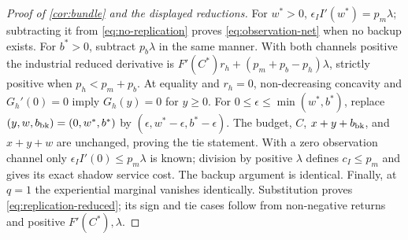 \begin{proof}[Proof of \cref{cor:bundle} and the displayed reductions]
For $w^*>0$, $\epsilon_II'(w^*)=p_m\lambda$; subtracting it from
\cref{eq:no-replication} proves \cref{eq:observation-net} when no
backup exists. For $b^*>0$, subtract $p_b\lambda$ in the same manner.
With both channels positive the industrial reduced derivative is
$F'(C^*)r_h+(p_m+p_b-p_h)\lambda$, strictly positive when
$p_h<p_m+p_b$. At equality and $r_h=0$, non-decreasing concavity and
$G_h'(0)=0$ imply $G_h(y)=0$ for $y\geq0$. For
$0\leq\epsilon\leq\min(w^*,b^*)$, replace
$(y,w,b_{\rm bk})=(0,w^*,b^*)$ by
$(\epsilon,w^*-\epsilon,b^*-\epsilon)$. The budget, $C$, $x+y+b_{\rm bk}$,
and $x+y+w$ are unchanged, proving the tie statement. With a zero
observation channel only $\epsilon_II'(0)\leq p_m\lambda$ is known;
division by positive $\lambda$ defines $c_I\leq p_m$ and gives its exact
shadow service cost. The backup argument is identical.
Finally, at $q=1$ the experiential marginal vanishes identically.
Substitution proves \cref{eq:replication-reduced}; its sign and tie cases
follow from non-negative returns and positive $F'(C^*),\lambda$.
\end{proof}

